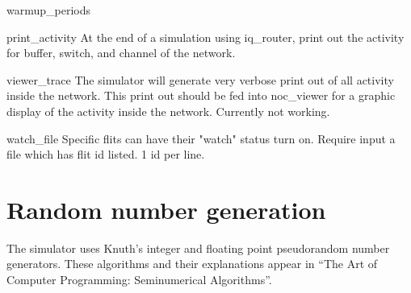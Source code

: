 \documentclass[11pt]{article}
\begin{document}
\begin{opt_list}{warmup\_periods}
\item[print\_activity] At the end of a simulation using iq\_router, print out the activity for buffer, switch, and channel of the network. 

\item[viewer\_trace] The simulator will generate very verbose print out of all activity inside the network. This print out should be fed into noc\_viewer for a graphic display of the activity inside the network. Currently not working. 

\item[watch\_file] Specific flits can have their "watch" status turn on. Require input a file which has flit id listed. 1 id per line. 

\end{opt_list}

\appendix

\section{Random number generation}

The simulator uses Knuth's integer and floating point pseudorandom
number generators.  These algorithms and their explanations appear in
``The Art of Computer Programming: Seminumerical Algorithms''.
\end{document}
